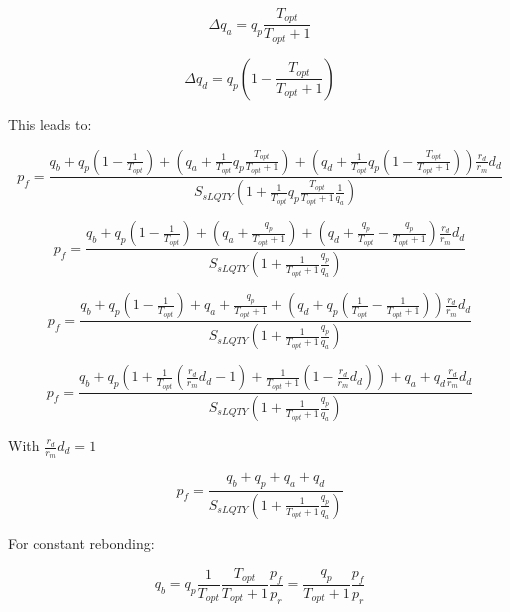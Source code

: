 \documentclass{article}
\begin{document}
\begin{equation}
\Delta q_{a} = q_{p} \frac{T_{opt}}{T_{opt}+1}
\end{equation}

\begin{equation}
\Delta q_{d} = q_{p} \left( 1- \frac{T_{opt}}{T_{opt}+1} \right)
\end{equation}

This leads to:

\[
p_{f} = \frac{q_{b}+q_{p} \left(1-\frac{1}{T_{opt}}\right)+\left(q_{a}+\frac{1}{T_{opt}} q_{p} \frac{T_{opt}}{T_{opt}+1}\right)+ \left(q_{d}+\frac{1}{T_{opt}} q_{p} \left( 1- \frac{T_{opt}}{T_{opt}+1}\right)\right)\frac{r_{d}}{r_{m}}d_{d}}{S_{sLQTY} \left( 1+\frac{1}{T_{opt}} q_{p} \frac{T_{opt}}{T_{opt}+1}\frac{1}{q_{a}} \right)}
\]

\[
p_{f} = \frac{q_{b}+q_{p} \left(1-\frac{1}{T_{opt}}\right)+\left(q_{a}+ \frac{q_{p}}{T_{opt}+1}\right)+ \left(q_{d}+\frac{q_{p}}{T_{opt}} - \frac{q_{p}}{T_{opt}+1}\right)\frac{r_{d}}{r_{m}}d_{d}}{S_{sLQTY} \left( 1+ \frac{1}{T_{opt}+1}\frac{q_{p}}{q_{a}} \right)}
\]

\[
p_{f} = \frac{q_{b}+q_{p}\left(1-\frac{1}{T_{opt}}\right)+q_{a}+ \frac{q_{p}}{T_{opt}+1}+\left(q_{d}+q_{p} \left( \frac{1}{T_{opt}}- \frac{1}{T_{opt}+1} \right)\right)\frac{r_{d}}{r_{m}}d_{d}}{S_{sLQTY}\left(1+  \frac{1}{T_{opt}+1}\frac{q_{p}}{q_{a}}\right)}
\]

\begin{equation}
  \label{eq:recursive_optimal_1}
p_{f} = \frac{q_{b}+q_{p} \left(1+\frac{1}{T_{opt}}\left(\frac{r_{d}}{r_{m}}d_{d}-1\right)+ \frac{1}{T_{opt}+1}\left( 1 - \frac{r_{d}}{r_{m}}d_{d} \right)\right)+q_{a}+q_{d}\frac{r_{d}}{r_{m}}d_{d}}{S_{sLQTY}\left(1+  \frac{1}{T_{opt}+1}\frac{q_{p}}{q_{a}}\right)}
\end{equation}

With $\frac{r_{d}}{r_{m}}d_{d}=1$

\begin{equation}
  \label{eq:recursive_optimal_2}
p_{f} = \frac{q_{b}+q_{p}+q_{a}+q_{d}}{S_{sLQTY}\left(1+  \frac{1}{T_{opt}+1}\frac{q_{p}}{q_{a}}\right)}
\end{equation}

For constant rebonding:

\begin{equation}
q_{b} = q_{p} \frac{1}{T_{opt}} \frac{T_{opt}}{T_{opt}+1}\frac{p_{f}}{p_{r}} = \frac{q_{p}}{T_{opt}+1}\frac{p_{f}}{p_{r}}
\end{equation}
\end{document}
